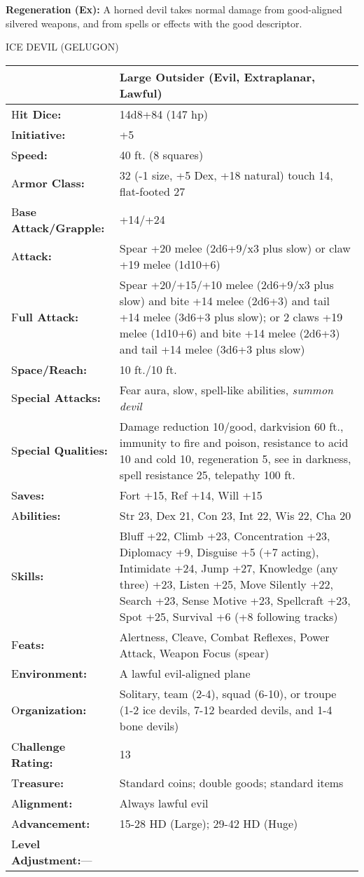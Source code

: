 \documentclass{article}
\begin{document}
\textbf{Regeneration (Ex):} A horned devil takes normal damage from good-aligned 
silvered weapons, and from spells or effects with the good descriptor.

\vspace{12pt}
ICE DEVIL (GELUGON)

\begin{tabular}{|>{\raggedright}p{91pt}|>{\raggedright}p{222pt}|}
\hline
  & Large Outsider (Evil, Extraplanar, Lawful)\tabularnewline
\hline
H\textbf{it Dice:} & 14d8+84 (147 hp)\tabularnewline
\hline
I\textbf{nitiative:} & +5\tabularnewline
\hline
S\textbf{peed:} & 40 ft. (8 squares)\tabularnewline
\hline
A\textbf{rmor Class:} & 32 (-1 size, +5 Dex, +18 natural) touch 14, flat-footed 
27\tabularnewline
\hline
B\textbf{ase Attack/Grapple:} & +14/+24\tabularnewline
\hline
A\textbf{ttack:} & Spear +20 melee (2d6+9/x3 plus slow) or claw +19 melee (1d10+6)\tabularnewline
\hline
F\textbf{ull Attack:} & Spear +20/+15/+10 melee (2d6+9/x3 plus slow) and bite +14 
melee (2d6+3) and tail +14 melee (3d6+3 plus slow); or 2 claws +19 melee (1d10+6) 
and bite +14 melee (2d6+3) and tail +14 melee (3d6+3 plus slow)\tabularnewline
\hline
S\textbf{pace/Reach:} & 10 ft./10 ft.\tabularnewline
\hline
S\textbf{pecial Attacks:} & Fear aura, slow, spell-like abilities, \textit{summon 
devil }\tabularnewline
\hline
S\textbf{pecial Qualities:} & Damage reduction 10/good, darkvision 60 ft., immunity 
to fire and poison, resistance to acid 10 and cold 10, regeneration 5, see in darkness, 
spell resistance 25, telepathy 100 ft.\tabularnewline
\hline
S\textbf{aves:} & Fort +15, Ref +14, Will +15\tabularnewline
\hline
A\textbf{bilities:} & Str 23, Dex 21, Con 23, Int 22, Wis 22, Cha 20\tabularnewline
\hline
S\textbf{kills:} & Bluff +22, Climb +23, Concentration +23, Diplomacy +9, Disguise 
+5 (+7 acting), Intimidate +24, Jump +27, Knowledge (any three) +23, Listen +25, 
Move Silently +22, Search +23, Sense Motive +23, Spellcraft +23, Spot +25, Survival 
+6 (+8 following tracks)\tabularnewline
\hline
F\textbf{eats:} & Alertness, Cleave, Combat Reflexes, Power Attack, Weapon Focus 
(spear)\tabularnewline
\hline
E\textbf{nvironment:} & A lawful evil-aligned plane\tabularnewline
\hline
O\textbf{rganization:} & Solitary, team (2-4), squad (6-10), or troupe (1-2 ice 
devils, 7-12 bearded devils, and 1-4 bone devils)\tabularnewline
\hline
C\textbf{hallenge Rating:} & 13\tabularnewline
\hline
T\textbf{reasure:} & Standard coins; double goods; standard items\tabularnewline
\hline
A\textbf{lignment:} & Always lawful evil\tabularnewline
\hline
A\textbf{dvancement:} & 15-28 HD (Large); 29-42 HD (Huge)\tabularnewline
\hline
L\textbf{evel Adjustment:}--- & \tabularnewline
\hline
\end{tabular}
\end{document}

